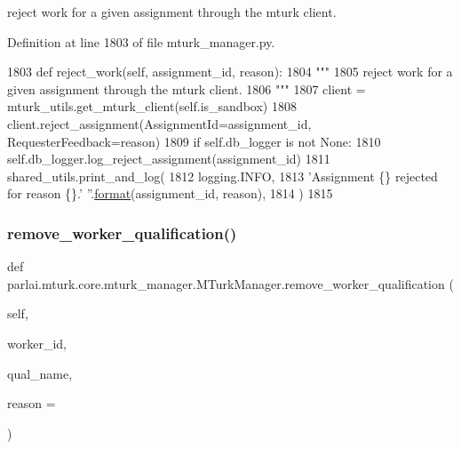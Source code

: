\begin{DoxyVerb}reject work for a given assignment through the mturk client.
\end{DoxyVerb}
 

Definition at line 1803 of file mturk\+\_\+manager.\+py.


\begin{DoxyCode}
1803     \textcolor{keyword}{def }reject\_work(self, assignment\_id, reason):
1804         \textcolor{stringliteral}{"""}
1805 \textcolor{stringliteral}{        reject work for a given assignment through the mturk client.}
1806 \textcolor{stringliteral}{        """}
1807         client = mturk\_utils.get\_mturk\_client(self.is\_sandbox)
1808         client.reject\_assignment(AssignmentId=assignment\_id, RequesterFeedback=reason)
1809         \textcolor{keywordflow}{if} self.db\_logger \textcolor{keywordflow}{is} \textcolor{keywordflow}{not} \textcolor{keywordtype}{None}:
1810             self.db\_logger.log\_reject\_assignment(assignment\_id)
1811         shared\_utils.print\_and\_log(
1812             logging.INFO,
1813             \textcolor{stringliteral}{'Assignment \{\} rejected for reason \{\}.'} \textcolor{stringliteral}{''}.\hyperlink{namespaceparlai_1_1chat__service_1_1services_1_1messenger_1_1shared__utils_a32e2e2022b824fbaf80c747160b52a76}{format}(assignment\_id, reason),
1814         )
1815 
\end{DoxyCode}
\mbox{\label{classparlai_1_1mturk_1_1core_1_1mturk__manager_1_1MTurkManager_aa96771f455f9e041b4d0105ef20de99a}} 
\subsubsection{\texorpdfstring{remove\+\_\+worker\+\_\+qualification()}{remove\_worker\_qualification()}}
{\footnotesize\ttfamily def parlai.\+mturk.\+core.\+mturk\+\_\+manager.\+M\+Turk\+Manager.\+remove\+\_\+worker\+\_\+qualification (\begin{DoxyParamCaption}\item[{}]{self,  }\item[{}]{worker\+\_\+id,  }\item[{}]{qual\+\_\+name,  }\item[{}]{reason = {\ttfamily \textquotesingle{}\textquotesingle{}} }\end{DoxyParamCaption})}

